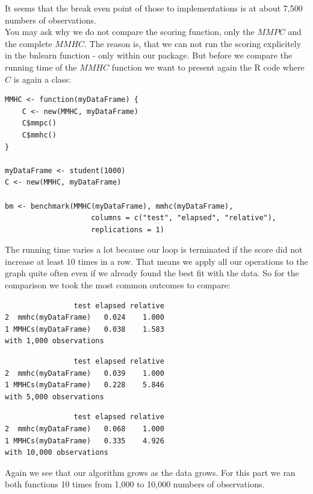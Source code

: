 
	It seems that the break even point of those to implementations is at about 7,500 numbers of observations.\\

	You may ask why we do not compare the scoring function, only the $MMPC$ and the complete $MMHC$. The reason is, that we can not run the scoring explicitely in the bnlearn function - only within our package. But before we compare the running time of the $MMHC$ function we want to present again the R code where $C$ is again a class:

 	\begin{verbatim}
MMHC <- function(myDataFrame) {
    C <- new(MMHC, myDataFrame)
    C$mmpc()
    C$mmhc()
}

myDataFrame <- student(1000)
C <- new(MMHC, myDataFrame)

bm <- benchmark(MMHC(myDataFrame), mmhc(myDataFrame),
                    columns = c("test", "elapsed", "relative"),
                    replications = 1)
 	\end{verbatim}

 	The running time varies a lot because our loop is terminated if the score did not increase at least 10 times in a row. That means we apply all our operations to the graph quite often even if we already found the best fit with the data. So for the comparison we took the most common outcomes to compare:

 	\begin{verbatim}
                test elapsed relative
2  mmhc(myDataFrame)   0.024    1.000
1 MMHCs(myDataFrame)   0.038    1.583
with 1,000 observations
 	\end{verbatim}

 	\begin{verbatim}
                test elapsed relative
2  mmhc(myDataFrame)   0.039    1.000
1 MMHCs(myDataFrame)   0.228    5.846
with 5,000 observations
 	\end{verbatim}

 	\begin{verbatim}
                test elapsed relative
2  mmhc(myDataFrame)   0.068    1.000
1 MMHCs(myDataFrame)   0.335    4.926
with 10,000 observations
 	\end{verbatim}

 	Again we see that our algorithm grows as the data grows. For this part we ran both functions 10 times from 1,000 to 10,000 numbers of observations.

